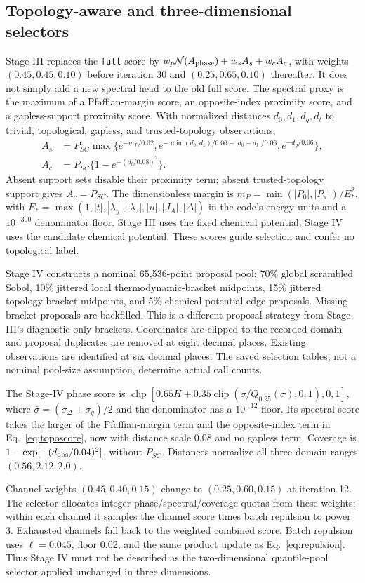 \subsection{Topology-aware and three-dimensional selectors}\label{sec:stage-selectors}
Stage III replaces the \texttt{full} score by $w_p\mathcal N(A_{\rm phase})+w_sA_s+w_cA_c$, with weights $(0.45,0.45,0.10)$ before iteration 30 and $(0.25,0.65,0.10)$ thereafter. It does not simply add a new spectral head to the old full score. The spectral proxy is the maximum of a Pfaffian-margin score, an opposite-index proximity score, and a gapless-support proximity score. With normalized distances $d_0,d_1,d_g,d_t$ to trivial, topological, gapless, and trusted-topology observations,
\begin{align}
A_s&=P_{SC}\max\{e^{-m_P/0.02},e^{-\min(d_0,d_1)/0.06-|d_0-d_1|/0.06},e^{-d_g/0.06}\},\label{eq:toposcore}\\
A_c&=P_{SC}\{1-e^{-(d_t/0.08)^2}\}.\label{eq:topocoverage}
\end{align}
Absent support sets disable their proximity term; absent trusted-topology support gives $A_c=P_{SC}$. The dimensionless margin is $m_P=\min(|P_0|,|P_\pi|)/E_*^2$, with $E_*=\max(1,|t|,|\lambda_y|,|\lambda_z|,|\mu|,|J_A|,|\Delta|)$ in the code's energy units and a $10^{-300}$ denominator floor. Stage III uses the fixed chemical potential; Stage IV uses the candidate chemical potential. These scores guide selection and confer no topological label.

Stage IV constructs a nominal 65,536-point proposal pool: 70\% global scrambled Sobol, 10\% jittered local thermodynamic-bracket midpoints, 15\% jittered topology-bracket midpoints, and 5\% chemical-potential-edge proposals. Missing bracket proposals are backfilled. This is a different proposal strategy from Stage III's diagnostic-only brackets. Coordinates are clipped to the recorded domain and proposal duplicates are removed at eight decimal places. Existing observations are identified at six decimal places. The saved selection tables, not a nominal pool-size assumption, determine actual call counts.

The Stage-IV phase score is $\operatorname{clip}[0.65H+0.35\operatorname{clip}(\bar\sigma/Q_{0.95}(\bar\sigma),0,1),0,1]$, where $\bar\sigma=(\sigma_\Delta+\sigma_q)/2$ and the denominator has a $10^{-12}$ floor. Its spectral score takes the larger of the Pfaffian-margin term and the opposite-index term in Eq.~\eqref{eq:toposcore}, now with distance scale 0.08 and no gapless term. Coverage is $1-\exp[-(d_{\rm obs}/0.04)^2]$, without $P_{SC}$. Distances normalize all three domain ranges $(0.56,2.12,2.0)$.

Channel weights $(0.45,0.40,0.15)$ change to $(0.25,0.60,0.15)$ at iteration 12. The selector allocates integer phase/spectral/coverage quotas from these weights; within each channel it samples the channel score times batch repulsion to power 3. Exhausted channels fall back to the weighted combined score. Batch repulsion uses $\ell=0.045$, floor 0.02, and the same product update as Eq.~\eqref{eq:repulsion}. Thus Stage IV must not be described as the two-dimensional quantile-pool selector applied unchanged in three dimensions.
